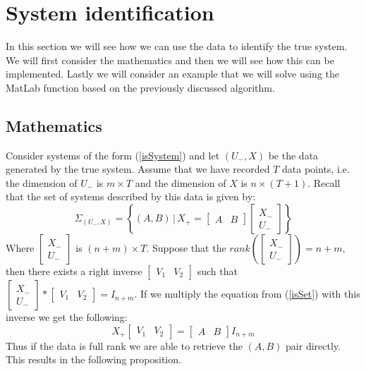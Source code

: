 \section{System identification}
In this section we will see how we can use the data to identify the true system. We will first consider the mathematics and then we will see how this can be implemented. Lastly we will consider an example that we will solve using the MatLab function based on the previously discussed algorithm.


\subsection{Mathematics}
Consider systems of the form (\ref{isSystem}) and let $(U_-,X)$ be the data generated by the true system. Assume that we have recorded $T$ data points, i.e. the dimension of $U_-$ is $m \times T$ and the dimension of $X$ is $n \times (T+1)$. Recall that the set of systems described by this data is given by:
\begin{equation}
	\label{isSet} 
	\Sigma_{(U_-,X)} = \left\{ (A, B) \, | \, X_{+} = \begin{bmatrix} A & B \end{bmatrix} \begin{bmatrix} X_{-} \\ U_{-} \end{bmatrix} \right\} 
\end{equation}
Where $\begin{bmatrix} X_{-} \\ U_{-} \end{bmatrix}$ is $(n+m) \times T$. Suppose that the $rank\left( \begin{bmatrix} X_{-} \\ U_{-} \end{bmatrix} \right) = n+m$, then there exists a right inverse $\begin{bmatrix} V_1 & V_2 \end{bmatrix}$ such that $\begin{bmatrix} X_{-} \\ U_{-} \end{bmatrix} * \begin{bmatrix} V_1 & V_2 \end{bmatrix} = I_{n+m}$. If we multiply the equation from (\ref{isSet}) with this inverse we get the following:
\begin{equation*}
	X_{+} \begin{bmatrix} V_1 & V_2 \end{bmatrix} = \begin{bmatrix} A & B \end{bmatrix} I_{n+m}
\end{equation*}
Thus if the data is full rank we are able to retrieve the $(A,B)$ pair directly. This results in the following proposition.

